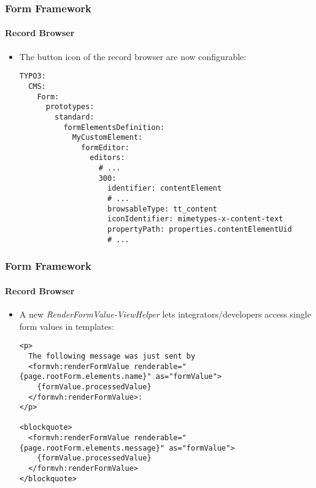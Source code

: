 
\begin{frame}[fragile]
	\frametitle{Form Framework}
	\framesubtitle{Record Browser}

	\lstset{basicstyle=\tiny\ttfamily}

	\begin{itemize}
		\item The button icon of the record browser are now configurable:
\begin{lstlisting}
TYPO3:
  CMS:
    Form:
      prototypes:
        standard:
          formElementsDefinition:
            MyCustomElement:
              formEditor:
                editors:
                  # ...
                  300:
                    identifier: contentElement
                    # ...
                    browsableType: tt_content
                    iconIdentifier: mimetypes-x-content-text
                    propertyPath: properties.contentElementUid
                    # ...
\end{lstlisting}

	\end{itemize}

\end{frame}


\begin{frame}[fragile]
	\frametitle{Form Framework}
	\framesubtitle{Record Browser}

	\lstset{basicstyle=\tiny\ttfamily}

	\begin{itemize}
		\item A new \textit{RenderFormValue-ViewHelper} lets integrators/developers access single form values in templates:
\begin{lstlisting}
<p>
  The following message was just sent by
  <formvh:renderFormValue renderable="{page.rootForm.elements.name}" as="formValue">
    {formValue.processedValue}
  </formvh:renderFormValue>:
</p>

<blockquote>
  <formvh:renderFormValue renderable="{page.rootForm.elements.message}" as="formValue">
    {formValue.processedValue}
  </formvh:renderFormValue>
</blockquote>
\end{lstlisting}

	\end{itemize}

\end{frame}

